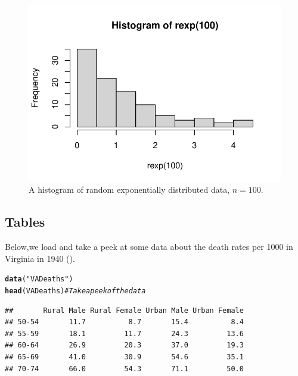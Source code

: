 \documentclass{article}\usepackage[]{graphicx}\usepackage[]{xcolor}
\makeatletter
\def\maxwidth{ %
  \ifdim\Gin@nat@width>\linewidth
    \linewidth
  \else
    \Gin@nat@width
  \fi
}
\newcommand{\hlsng}[1]{\textcolor[rgb]{0.192,0.494,0.8}{#1}}%
\newcommand{\hlcom}[1]{\textcolor[rgb]{0.678,0.584,0.686}{\textit{#1}}}%
\newcommand{\hldef}[1]{\textcolor[rgb]{0.345,0.345,0.345}{#1}}%
\newcommand{\hlkwd}[1]{\textcolor[rgb]{0.737,0.353,0.396}{\textbf{#1}}}%
\newenvironment{kframe}{%
 \def\at@end@of@kframe{}%
 \ifinner\ifhmode%
  \def\at@end@of@kframe{\end{minipage}}%
  \begin{minipage}{\columnwidth}%
 \fi\fi%
 \def\FrameCommand##1{\hskip\@totalleftmargin \hskip-\fboxsep
 \colorbox{shadecolor}{##1}\hskip-\fboxsep
     \hskip-\linewidth \hskip-\@totalleftmargin \hskip\columnwidth}%
 \MakeFramed {\advance\hsize-\width
   \@totalleftmargin\z@ \linewidth\hsize
   \@setminipage}}%
 {\par\unskip\endMakeFramed%
 \at@end@of@kframe}
\newenvironment{knitrout}{}{} %
\makeatother
\begin{document}
\begin{multicols}{2}
\begin{figure}[H]
\begin{center}
\begin{knitrout}
\color{fgcolor}
\includegraphics[width=\maxwidth]{figure/unnamed-chunk-6-1} 
\end{knitrout}
\caption{A histogram of random exponentially distributed data, $n=100$.}
\label{plot1} %
\end{center}
\end{figure}

\columnbreak

\subsection{Tables}

Below,we load and take a peek at some data about the death
 rates per 1000 in Virginia in 1940 (\cite{molyneaux1947differences}).
 
\begin{knitrout}
\color{fgcolor}\begin{kframe}
\begin{alltt}
\hlkwd{data}\hldef{(}\hlsng{"VADeaths"}\hldef{)}
\hlkwd{head}\hldef{(VADeaths)} \hlcom{# Take a peek of the data}
\end{alltt}
\begin{verbatim}
##       Rural Male Rural Female Urban Male Urban Female
## 50-54       11.7          8.7       15.4          8.4
## 55-59       18.1         11.7       24.3         13.6
## 60-64       26.9         20.3       37.0         19.3
## 65-69       41.0         30.9       54.6         35.1
## 70-74       66.0         54.3       71.1         50.0
\end{verbatim}
\end{kframe}
\end{knitrout}


\end{multicols}
\end{document}
